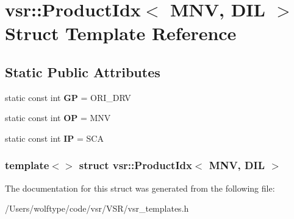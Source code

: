 \hypertarget{structvsr_1_1_product_idx_3_01_m_n_v_00_01_d_i_l_01_4}{\section{vsr\-:\-:Product\-Idx$<$ M\-N\-V, D\-I\-L $>$ Struct Template Reference}
\label{structvsr_1_1_product_idx_3_01_m_n_v_00_01_d_i_l_01_4}
}
\subsection*{Static Public Attributes}
\begin{DoxyCompactItemize}
\item 
\hypertarget{structvsr_1_1_product_idx_3_01_m_n_v_00_01_d_i_l_01_4_a979c13999a0154029ef079aab60a9017}{static const int {\bfseries G\-P} = O\-R\-I\-\_\-\-D\-R\-V}\label{structvsr_1_1_product_idx_3_01_m_n_v_00_01_d_i_l_01_4_a979c13999a0154029ef079aab60a9017}

\item 
\hypertarget{structvsr_1_1_product_idx_3_01_m_n_v_00_01_d_i_l_01_4_a22b431cf95a8711bfa800dc016feba3f}{static const int {\bfseries O\-P} = M\-N\-V}\label{structvsr_1_1_product_idx_3_01_m_n_v_00_01_d_i_l_01_4_a22b431cf95a8711bfa800dc016feba3f}

\item 
\hypertarget{structvsr_1_1_product_idx_3_01_m_n_v_00_01_d_i_l_01_4_a27c096563de47b735cd702d3cf95f612}{static const int {\bfseries I\-P} = S\-C\-A}\label{structvsr_1_1_product_idx_3_01_m_n_v_00_01_d_i_l_01_4_a27c096563de47b735cd702d3cf95f612}

\end{DoxyCompactItemize}
\subsubsection*{template$<$$>$ struct vsr\-::\-Product\-Idx$<$ M\-N\-V, D\-I\-L $>$}



The documentation for this struct was generated from the following file\-:\begin{DoxyCompactItemize}
\item 
/\-Users/wolftype/code/vsr/\-V\-S\-R/vsr\-\_\-templates.\-h\end{DoxyCompactItemize}
